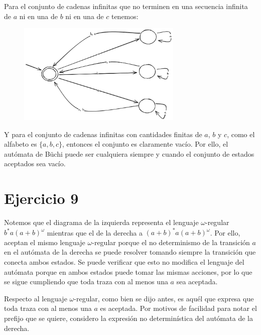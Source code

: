 \documentclass{article}
\begin{document}
Para el conjunto de cadenas infinitas que no terminen en una secuencia infinita de $a$ ni en una de $b$ ni en una de $c$ tenemos:
\begin{figure}[!htb]
	\includegraphics[width=0.7\textwidth]{04-08-c.png}
	\centering
\end{figure}

Y para el conjunto de cadenas infinitas con cantidades finitas de $a$, $b$ y $c$, como el alfabeto es $\{a, b, c\}$, entonces el conjunto es claramente vacío.
Por ello, el autómata de Büchi puede ser cualquiera siempre y cuando el conjunto de estados aceptados sea vacío.

\section*{Ejercicio 9}
Notemos que el diagrama de la izquierda representa el lenguaje $\omega$-regular $b^*a(a + b)^\omega$ mientras que el de la derecha a $(a + b)^*a(a + b)^\omega$.
Por ello, aceptan el mismo lenguaje $\omega$-regular porque el no determinismo de la transición $a$ en el autómata de la derecha se puede resolver tomando siempre la transición que conecta ambos estados.
Se puede verificar que esto no modifica el lenguaje del autómata porque en ambos estados puede tomar las mismas acciones, por lo que se sigue cumpliendo que toda traza con al menos una $a$ sea aceptada.

Respecto al lenguaje $\omega$-regular, como bien se dijo antes, es aquél que expresa que toda traza con al menos una $a$ es aceptada.
Por motivos de facilidad para notar el prefijo que se quiere, considero la expresión no determinística del autómata de la derecha.
\end{document}
